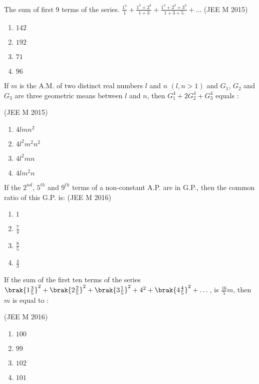     \item The sum of first $9$ terms of the series.
	    $\frac{1^3}{1}+\frac{1^3+2^3}{1+3}+\frac{1^3+2^3+3^3}{1+3+5}+\dots$
    \hfill(JEE M 2015)
    \begin{enumerate}
    \item $142$
    \item $192$
    \item $71$
    \item $96$
    \end{enumerate}
    \item If $m$ is the A.M. of two distinct real numbers $l$ and $n$ $(l,n>1)$ and $G_1$, $G_2$ and $G_3$ are three geometric means between $l$ and $n$, then $G_1^4+2G_2^4+G_3^4$ equals :
    
    \hfill(JEE M 2015)
    \begin{enumerate}
    \item$4lmn^2$
    \item$4l^2m^2n^2$
    \item$4l^2mn$
    \item$4lm^2n$ 
    \end{enumerate}

    \item If the $2^{nd}$, $5^{th}$ and $9^{th}$ terms of a non-constant A.P. are in G.P., then the common ratio of this G.P. is:
    \hfill(JEE M 2016)
    \begin{enumerate}
    \item $1$
    \item $\frac{7}{4}$
    \item $\frac{8}{5}$
    \item $\frac{4}{3}$
    \end{enumerate}
    
    \item If the sum of the first ten terms of the series $\brak{1\frac{3}{5}}^2+\brak{2\frac{2}{5}}^2+\brak{3\frac{1}{5}}^2+4^2+\brak{4\frac{4}{5}}^2+\dots$, is $\frac{16}{5}m$, then $m$ is equal to :
    
    \hfill(JEE M 2016)
    \begin{enumerate}
    \item$100$
    \item$99$
    \item$102$
    \item$101$
    \end{enumerate}

